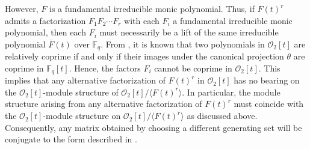 \documentclass[11pt,twoside]{amsart}
\newcommand{\R}{\mathscr{O}_2}
\newcommand{\Fq}{\mathbb{F}_q}
\theoremstyle{definition} %
\begin{document}
However, $F$ is a fundamental irreducible monic polynomial.
Thus, if $F(t)^r$ admits a factorization $F_1F_2\cdots F_r$ with each $F_i$ a fundamental irreducible monic polynomial, then each $F_i$ must necessarily be a lift of the same irreducible polynomial $\overline{F}(t)$ over $\Fq$. 
From , it is known that two polynomials in $\R[t]$ are relatively coprime if and only if their images under the canonical projection $\theta$ are coprime in $\Fq[t]$.
Hence, the factors $F_i$ cannot be coprime in $\R[t]$.
This implies that any alternative factorization of $F(t)^r$ in $\R[t]$ has no bearing on the $\R[t]$-module structure of $\R[t]/\langle F(t)^r\rangle$.
In particular, the module structure arising from any alternative factorization of $F(t)^r$ must coincide with the $\R[t]$-module structure on $\R[t]/\langle F(t)^r\rangle$ as discussed above. Consequently, any matrix obtained by choosing a different generating set will be conjugate to the form described in .
\end{document}
